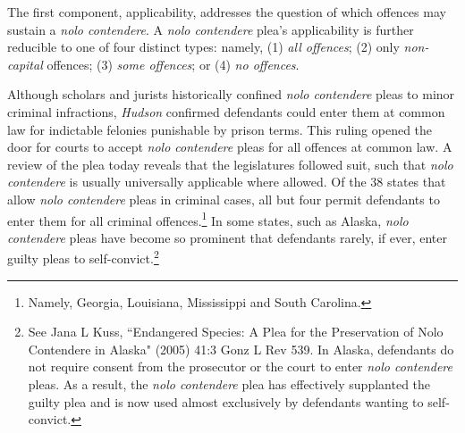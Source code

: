 The first component, applicability, addresses the question of which offences may sustain a \textit{nolo contendere}. A \textit{nolo contendere} plea's applicability is further reducible to one of four distinct types: namely, (1) \textit{all offences}; (2) only \textit{non-capital} offences; (3) \textit{some offences}; or (4) \textit{no offences}. 

Although scholars and jurists historically confined \textit{nolo contendere} pleas to minor criminal infractions, \textit{Hudson} confirmed defendants could enter them at common law for indictable felonies punishable by prison terms. This ruling opened the door for courts to accept \textit{nolo contendere} pleas for all offences at common law. A review of the plea today reveals that the legislatures followed suit, such that \textit{nolo contendere} is usually universally applicable where allowed. Of the 38 states that allow \textit{nolo contendere} pleas in criminal cases, all but four permit defendants to enter them for all criminal offences.\footnote{Namely, Georgia, Louisiana, Mississippi and South Carolina.} In some states, such as Alaska, \textit{nolo contendere} pleas have become so prominent that defendants rarely, if ever, enter guilty pleas to self-convict.\footnote{See Jana L Kuss, ``Endangered Species: A Plea for the Preservation of Nolo Contendere in
Alaska" (2005) 41:3 Gonz L Rev 539. In Alaska, defendants do not require consent from the prosecutor or the court to enter \textit{nolo contendere} pleas. As a result, the \textit{nolo contendere} plea has effectively supplanted the guilty plea and is now used almost exclusively by defendants wanting to self-convict.}

